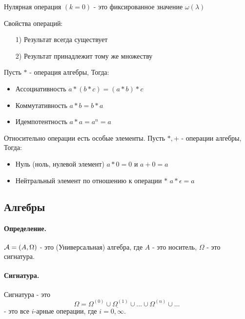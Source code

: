 \documentclass{report}
\begin{document}
\medskip

Нулярная операция $(k = 0)$ - это фиксированное значение $\omega(\lambda)$

\medskip

Свойства операций:
\begin{itemize}
	\item[1)] Результат всегда существует
	\item[2)] Результат принадлежит тому же множеству
\end{itemize}

\medskip

Пусть $*$ - операция алгебры, Тогда:
\begin{itemize}
	\item Ассоциативность\newline
	      $a * (b * c) = (a * b) * c$
	\item Коммутативность\newline
	      $a*b = b*a$
	\item Идемпотентность\newline
	      $a*a = a^{n} = a$
\end{itemize}

Относительно операции есть особые элементы. Пусть $*, +$ - операции алгебры, Тогда:
\begin{itemize}
	\item Нуль (ноль, нулевой элемент)\newline
	      $a*0 = 0$ и $a+0=a$
	\item Нейтральный элемент по отношению к операции $*$\newline
	      $a*\epsilon = a$
\end{itemize}

\subsection{Алгебры}
\paragraph*{Определение.}
${\cal A} = (A, \Omega)$ - это (Универсальная) алгебра, где $A$ - это носитель,
$\Omega$ - это сигнатура.


\paragraph*{Сигнатура.}
Сигнатура - это
\[
\Omega = \Omega^{(0)} \cup \Omega^{(1)} \cup \ldots \cup \Omega^{(n)} \cup \ldots
\] 
- это все $i$-арные операции, где $i = \overline{0,\infty}$.
\end{document}
